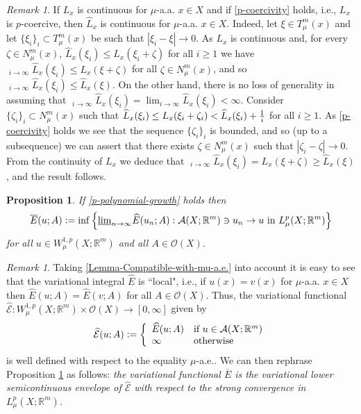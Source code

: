 \documentclass[10pt]{amsart}
\numberwithin{equation}{section}
\newtheorem{proposition}[theorem]{Proposition}
\theoremstyle{definition}
\theoremstyle{remark}
\newtheorem{remark}[theorem]{Remark}
\begin{document}
\begin{remark}\label{continuity-remaRk}
If $L_x$ is continuous for $\mu$-a.a. $x\in X$ and if \eqref{p-coercivity} holds, i.e., $L_x$ is $p$-coercive, then $\widehat{L}_x$ is continuous for $\mu$-a.a. $x\in X$. Indeed, let $\xi\in T^m_\mu(x)$ and let $\{\xi_i\}_i\subset T^m_\mu(x)$ be such that $|\xi_i-\xi|\to0$. As $L_x$ is continuous and, for every $\zeta\in N_\mu^m(x)$, $\widehat{L}_x(\xi_i)\leq L_x(\xi_i+\zeta)$ for all $i\geq 1$ we have ${\mathop{\overline{\lim}}}_{i\to\infty}\widehat{L}_x(\xi_i)\leq L_x(\xi+\zeta)$ for all $\zeta\in N_\mu^m(x)$, and so ${\mathop{\overline{\lim}}}_{i\to\infty}\widehat{L}_x(\xi_i)\leq \widehat{L}_x(\xi)$. On the other hand, there is no loss of generality in assuming that ${\mathop{\underline{\lim}}}_{i\to\infty}\widehat{L}_x(\xi_i)=\lim_{i\to\infty}\widehat{L}_x(\xi_i)<\infty$. Consider $\{\zeta_i\}_i\subset N^m_\mu(x)$ such that $\widehat{L}_x(\xi_i)\leq L_x(\xi_i+\zeta_i)<\widehat{L}_x(\xi_i)+{1\over i}$ for all $i\geq 1$. As \eqref{p-coercivity} holds we see that the sequence $\{\zeta_i\}_i$ is bounded, and so (up to a subsequence) we can assert that there exists $\zeta\in N^m_\mu(x)$ such that $|\zeta_i-\zeta|\to0$. From the continuity of $L_x$ we deduce that  ${\mathop{\underline{\lim}}}_{i\to\infty}\widehat{L}_x(\xi_{i})=L_x(\xi+\zeta)\geq \widehat{L}_x(\xi)$, and the result follows.
\end{remark}

\begin{proposition}\label{MR1}
If \eqref{p-polynomial-growth} holds then
$$
\overline{E}(u;A):=\inf\left\{{\mathop{\underline{\lim}}}_{n\to\infty}\widehat{E}(u_n;A):\mathcal{A}(X;{{\mathbb R}}^m)\ni u_n\to u\hbox{ in }L^p_\mu(X;{{\mathbb R}}^m)\right\}
$$
for all $u\in W^{1,p}_\mu(X;{{\mathbb R}}^m)$ and all $A\in\mathcal{O}(X)$.
\end{proposition}

\begin{remark}
Taking \eqref{Lemma-Compatible-with-mu-a.e.} into account it is easy to see that the variational integral $\widehat{E}$ is ``local", i.e., if $u(x)=v(x)$ for $\mu$-a.a. $x\in X$ then $\widehat{E}(u;A)=\widehat{E}(v;A)$ for all $A\in\mathcal{O}(X)$. Thus, the variational functional $\widehat{\mathcal{E}}:W^{1,p}_\mu(X;{{\mathbb R}}^m)\times\mathcal{O}(X)\to[0,\infty]$ given by
\begin{equation}\label{DeF-fUnCt-RemarK-Local}
\widehat{\mathcal{E}}(u;A):=\left\{
\begin{array}{ll}
\widehat{E}(u;A)&\hbox{if }u\in \mathcal{A}(X;{{\mathbb R}}^m)\\
\infty&\hbox{otherwise}
\end{array}
\right.
\end{equation}
is well defined with respect to the equality $\mu$-a.e.. We can then rephrase Proposition \ref{MR1} as follows: {\em the variational functional $\overline{E}$ is the variational lower semicontinuous envelope of $\widehat{\mathcal{E}}$ with respect to the strong convergence in $L^p_\mu(X;{{\mathbb R}}^m)$}.
\end{remark}
\end{document}

